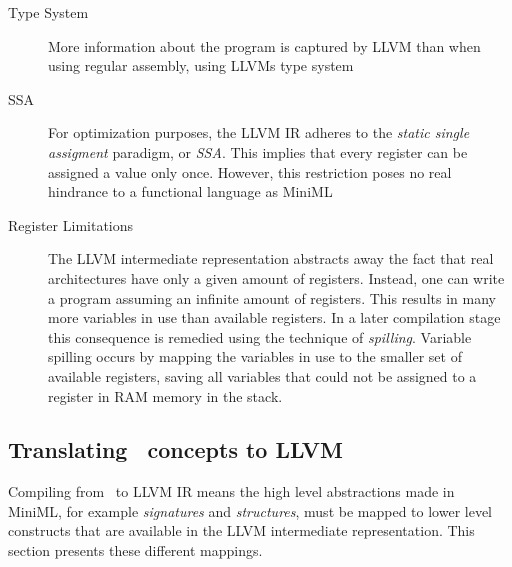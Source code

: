 \begin{description}
\item[Type System] More information about the program is captured by LLVM than when using regular assembly, using LLVMs type system
\item[SSA] For optimization purposes, the LLVM IR adheres to the \emph{static single assigment} paradigm, or \emph{SSA}.
This implies that every register can be assigned a value only once. However, this restriction poses no real hindrance to a functional language as \mbox{MiniML}
\item[Register Limitations]  The LLVM intermediate representation abstracts away the fact that real architectures have only a given amount of registers.
Instead, one can write a program assuming an infinite amount of registers.
This results in many more variables in use than available registers.
In a later compilation stage this consequence is remedied using the technique of \emph{spilling}.
Variable spilling occurs by mapping the variables in use to the smaller set of available registers, saving all variables that could not be assigned to a register in RAM memory in the stack.
\end{description}

\subsection{Translating \MiniML\ concepts to LLVM}
\label{sec:translation}
Compiling from \MiniML\ to LLVM IR means the high level abstractions made in \mbox{MiniML}, for example \emph{signatures} and \emph{structures}, must be mapped to lower level constructs that are available in the LLVM intermediate representation.
This section presents these different mappings.

